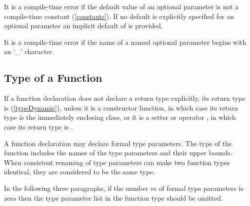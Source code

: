 \documentclass{article}
\begin{document}
\LMHash{}
It is a compile-time error if the default value of an optional parameter is not a compile-time constant (\ref{constants}).
If no default is explicitly specified for an optional parameter an implicit default of \NULL{} is provided.

\LMHash{}
It is a compile-time error if the name of a named optional parameter begins with an `\_' character.



\subsection{Type of a Function}

\LMHash{}
If a function declaration does not declare a return type explicitly, its return type is \DYNAMIC{} (\ref{typeDynamic}),
unless it is a constructor function, in which case its return type is the immediately enclosing class,
or it is a setter or operator \code{[]=}, in which case its return type is \VOID{}.

\LMHash{}
A function declaration may declare formal type parameters.
The type of the function includes the names of the type parameters and their upper bounds.
When consistent renaming of type parameters can make two function types identical,
they are considered to be the same type.


\LMHash{}
In the following three paragraphs,
if the number $m$ of formal type parameters is zero then the type parameter list in the function type should be omitted.
\end{document}
